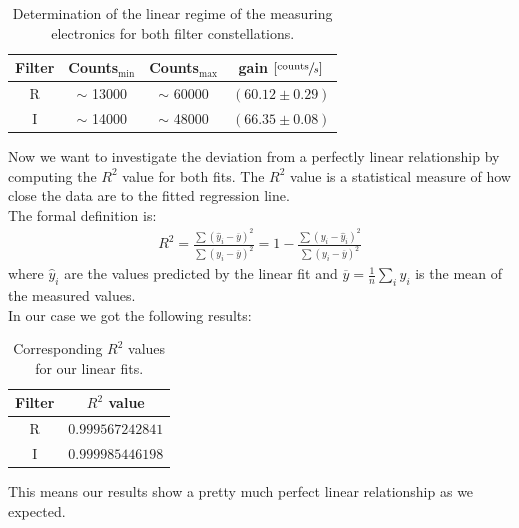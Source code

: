 \begin{table}[H]
\setlength{\tabcolsep}{5mm}
\setlength\extrarowheight{2mm}
\centering
\begin{tabular}{c| c c c }

Filter  & Counts$_{\text{min}}$ & Counts$_{\text{max}}$ & gain $\left[\sfrac{\text{counts}}{s}\right]$ \\ \hline 

R & $\sim$ 13000 & $\sim$ 60000 & $(60.12 \pm 0.29)$ \\
I & $\sim$ 14000 & $\sim$ 48000 & $(66.35 \pm 0.08)$ \\

\end{tabular}
\caption{Determination of the linear regime of the measuring electronics for both filter constellations.}
\end{table}
Now we want to investigate the deviation from a perfectly linear relationship by computing the $R^2$ value for both fits. The $R^2$ value is a statistical measure of how close the data are to the fitted regression line.  \\
The formal definition is:
\begin{align}
	R^2 = 
\frac{\displaystyle\sum\nolimits \left(\hat{y}_i- \overline{y}\right)^2}{\displaystyle\sum\nolimits \left(y_i - \overline{y}\right)^2} 
 =1-\frac{\displaystyle\sum\nolimits \left(y_i - \hat{y}_i\right)^2}{\displaystyle\sum\nolimits \left(y_i - \overline{y}\right)^2}
\end{align}
where $\hat{y}_i$ are the values predicted by the linear fit and $\overline{y} = \frac{1}{n}\sum_{i} y_i$ is the mean of the measured values.\\
In our case we got the following results: 
\begin{table}[H]
\setlength{\tabcolsep}{5mm}
\setlength\extrarowheight{2mm}
\centering
\begin{tabular}{c| c}

Filter  & $ R^2 $ value \\ \hline 

R & $0.999567242841$ \\
I & $0.999985446198$ \\

\end{tabular}
\caption{Corresponding $R^2$ values for our linear fits.}
\end{table}

This means our results show a pretty much perfect linear relationship as we expected.
